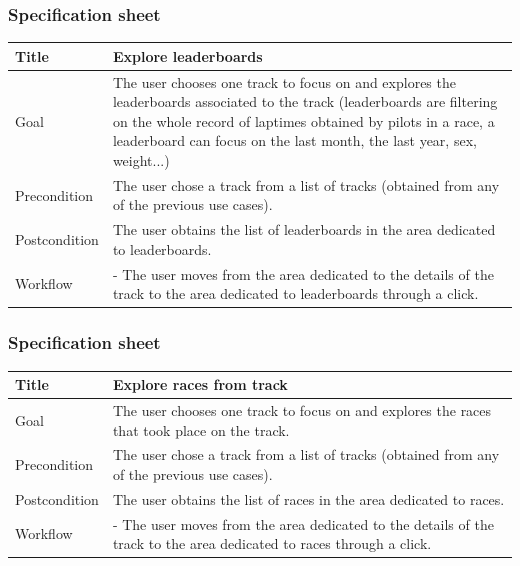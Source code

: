 \documentclass{beamer}
\begin{document}
\begin{frame}
    \frametitle{Specification sheet}
    \begin{table}
        \tiny
        \begin{tabular}{|p{2cm}|p{6cm}|}
        \hline
        Title & \textbf{Explore leaderboards} \\
        \hline
        Goal & The user chooses one track to focus on and explores the leaderboards associated
        to the track (leaderboards are filtering on the whole record of laptimes obtained by pilots in a race,
        a leaderboard can focus on the last month, the last year, sex, weight...) \\
        \hline
        Precondition & The user chose a track from a list of tracks (obtained from any of the previous use cases).\\
        \hline
        Postcondition & The user obtains the list of leaderboards in the area dedicated to leaderboards. \\
        \hline
        Workflow &
        - The user moves from the area dedicated to the details of the track to the
        area dedicated to leaderboards through a click. \\
        \hline
        \end{tabular}
\end{table}
\end{frame}

\begin{frame}
    \frametitle{Specification sheet}
    \begin{table}
        \tiny
        \begin{tabular}{|p{2cm}|p{6cm}|}
        \hline
        Title & \textbf{Explore races from track} \\
        \hline
        Goal & The user chooses one track to focus on and explores the races that took place on the track. \\
        \hline
        Precondition & The user chose a track from a list of tracks (obtained from any of the previous use cases).\\
        \hline
        Postcondition & The user obtains the list of races in the area dedicated to races. \\
        \hline
        Workflow &
        - The user moves from the area dedicated to the details of the track to the
        area dedicated to races through a click. \\
        \hline
        \end{tabular}
\end{table}
\end{frame}
\end{document}
